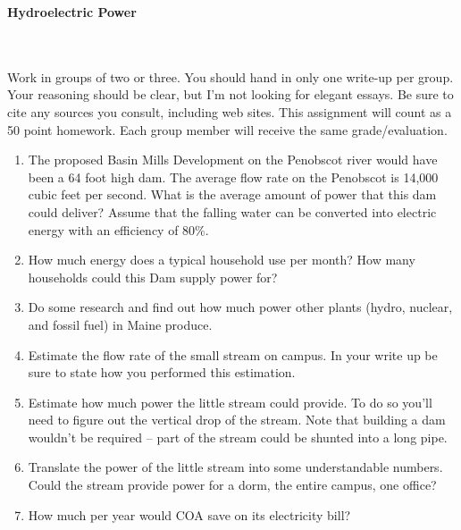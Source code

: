 
\oddsidemargin=0in
\textwidth=6.2in
\topmargin=0in
\textheight=9.9in

\renewcommand{\arraystretch}{1.3}


\pagestyle{empty}

\begin{center}
{\Large {\bf Hydroelectric Power}} \\
\hspace{3cm}\\
\end{center}
\hspace{1cm}\\

Work in groups of two or three.  You should hand in only one write-up
per group.   Your reasoning should be clear, but I'm not looking for
elegant essays.  Be sure to cite any sources you consult, including web
sites.  This assignment will count as a 50 point homework.  Each
group member will receive the same grade/evaluation. 


\begin{enumerate}


\item The proposed Basin Mills Development on the Penobscot river
would have been a 64 foot high dam.  The average flow rate on the
Penobscot is 14,000 cubic feet per second.  What is the average amount
of power that this dam could deliver?  Assume that the falling water
can be converted into electric energy with an efficiency of 80\%.  

\item How much energy does a typical household use per month?  How
many households could this Dam supply power for?

\item  Do some research and find out how much power other plants
(hydro, nuclear, and fossil fuel) in Maine produce.

\item Estimate the flow rate of the small stream on campus.  In your
write up be sure to state how you performed this estimation.

\item Estimate how much power the little stream could provide.  To do
so you'll need to figure out the vertical drop of the stream.  Note
that building a dam wouldn't be required -- part of the stream could
be shunted into a long pipe.

\item  Translate the power of the little stream into some
understandable numbers.  Could the stream provide power for a dorm,
the entire campus, one office?  

\item How much per year would COA save on its electricity bill?

\end{enumerate}

